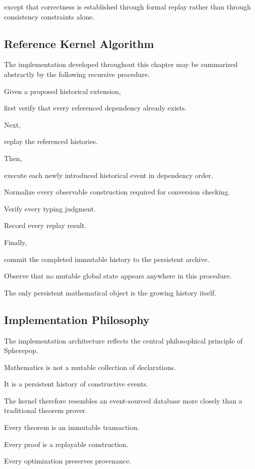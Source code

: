 \documentclass[12pt,oneside]{article}
\theoremstyle{definition}
\theoremstyle{remark}
\begin{document}
except that correctness is established through formal replay rather than through
consistency constraints alone.

\subsection{Reference Kernel Algorithm}

The implementation developed throughout this chapter may be summarized
abstractly by the following recursive procedure.

Given a proposed historical extension,

first verify that every referenced dependency already exists.

Next,

replay the referenced histories.

Then,

execute each newly introduced historical event in dependency order.

Normalize every observable construction required for conversion checking.

Verify every typing judgment.

Record every replay result.

Finally,

commit the completed immutable history to the persistent archive.

Observe that no mutable global state appears anywhere in this procedure.

The only persistent mathematical object is the growing history itself.

\subsection{Implementation Philosophy}

The implementation architecture reflects the central philosophical principle of
Spherepop.

Mathematics is not a mutable collection of declarations.

It is a persistent history of constructive events.

The kernel therefore resembles an event-sourced database more closely than a
traditional theorem prover.

Every theorem is an immutable transaction.

Every proof is a replayable construction.

Every optimization preserves provenance.
\end{document}

